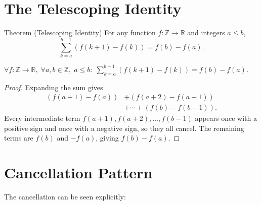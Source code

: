 
\section*{The Telescoping Identity}

\begin{theorembox}{Theorem (Telescoping Identity)}
For any function \(f : \mathbb{Z} \to \mathbb{R}\) and integers \(a \le b\),
\[
\sum_{k=a}^{b-1} (f(k+1) - f(k)) = f(b) - f(a).
\]
\end{theorembox}
\label{thm:telescoping}

\begin{remark*}
\(\forall f : \mathbb{Z}\to\mathbb{R},\; \forall a,b \in \mathbb{Z},\; a \le b:\;
\displaystyle\sum_{k=a}^{b-1}(f(k+1)-f(k)) = f(b)-f(a)\).
\end{remark*}

\begin{proof}
Expanding the sum gives
\[
\begin{aligned}
(f(a+1)-f(a)) &+ (f(a+2)-f(a+1)) \\
              &+ \cdots + (f(b)-f(b-1)).
\end{aligned}
\]
Every intermediate term \(f(a+1), f(a+2), \dots, f(b-1)\) appears once
with a positive sign and once with a negative sign, so they all cancel.
The remaining terms are \(f(b)\) and \(-f(a)\), giving \(f(b)-f(a)\).
\end{proof}

\section*{Cancellation Pattern}

The cancellation can be seen explicitly:
\begin{center}
\end{center}


